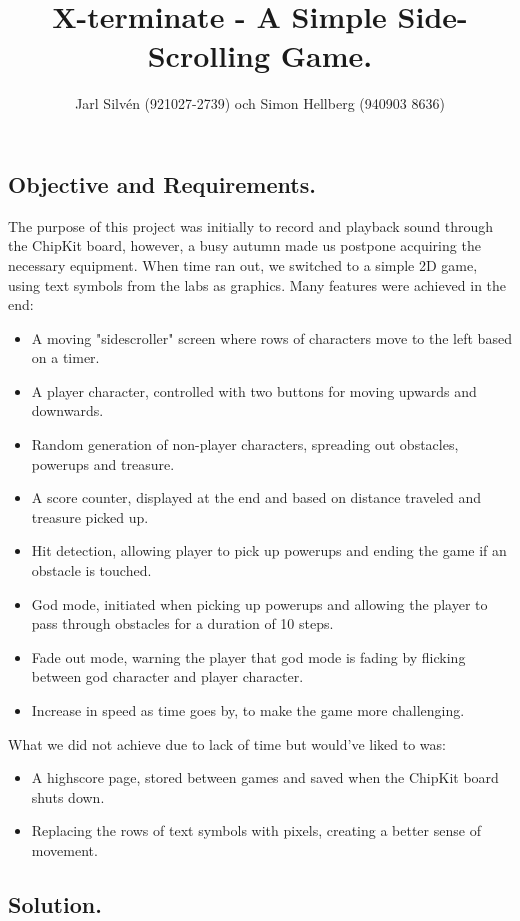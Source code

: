 \documentclass[a4paper,11pt,twoside]{article}
\title{X-terminate - A Simple Side-Scrolling Game.}
\author{Jarl Silvén (921027-2739) och Simon Hellberg (940903 8636)}
\date{\thedate}
\begin{document}
\maketitle

\newpage

\subsection*{Objective and Requirements.}

The purpose of this project was initially to record and playback sound through the ChipKit board, however, a busy autumn made us postpone acquiring the necessary equipment. When time ran out, we switched to a simple 2D game, using text symbols from the labs as graphics. Many features were achieved in the end:
\begin{itemize}
\item A moving "sidescroller" screen where rows of characters move to the left based on a timer.
\item A player character, controlled with two buttons for moving upwards and downwards.
\item Random generation of non-player characters, spreading out obstacles, powerups and treasure.
\item A score counter, displayed at the end and based on distance traveled and treasure picked up.
\item Hit detection, allowing player to pick up powerups and ending the game if an obstacle is touched.
\item God mode, initiated when picking up powerups and allowing the player to pass through obstacles for a duration of 10 steps.
\item Fade out mode, warning the player that god mode is fading by flicking between god character and player character.
\item Increase in speed as time goes by, to make the game more challenging.
\end{itemize}
What we did not achieve due to lack of time but would've liked to was:
\begin{itemize}
\item A highscore page, stored between games and saved when the ChipKit board shuts down.
\item Replacing the rows of text symbols with pixels, creating a better sense of movement.
\end{itemize}

\subsection*{Solution.}
\end{document}
